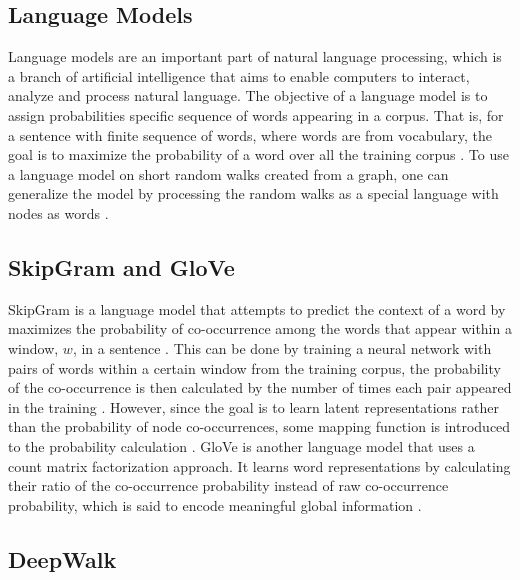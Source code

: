 \subsection{Language Models}

Language models are an important part of natural language processing, which is a branch of artificial intelligence that aims to enable computers to interact, analyze and process natural language. The objective of a language model is to assign probabilities specific sequence of words appearing in a corpus.
That is, for a sentence with finite sequence of words, where words are from vocabulary, the goal is to maximize the probability of a word over all the training corpus \cite{perozzi_deepwalk:_2014}.
To use a language model on short random walks created from a graph, one can generalize the model by processing the random walks as a special language with nodes as words \cite{perozzi_deepwalk:_2014}.

\subsection{SkipGram and GloVe}

SkipGram is a language model that attempts to predict the context of a word by maximizes the probability of co-occurrence among the words that appear within a window, $w$, in a sentence \cite{perozzi_deepwalk:_2014}. This can be done by training a neural network with pairs of words within a certain window from the training corpus, the probability of the co-occurrence is then calculated by the number of times each pair appeared in the training \cite{mccormick_word2vec_nodate}. However, since the goal is to learn latent representations rather than the probability of node co-occurrences, some mapping function is introduced to the probability calculation \cite{perozzi_deepwalk:_2014}. \ac{GloVe} is another language model that uses a count matrix factorization approach. It learns word representations by calculating their ratio of the co-occurrence probability instead of raw co-occurrence probability, which is said to encode meaningful global information \cite{pennington_glove:_2014}. 

\subsection{DeepWalk}

